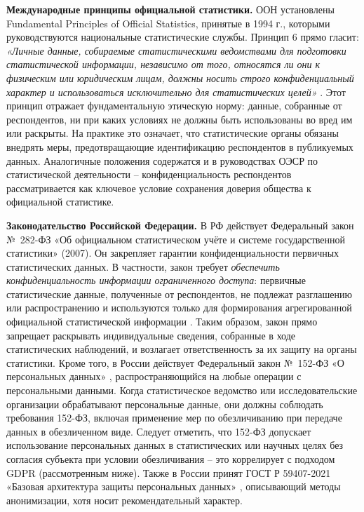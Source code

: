 \textbf{Международные принципы официальной статистики.} ООН
установлены Fundamental Principles of Official Statistics, принятые в 1994 г., которыми руководствуются национальные
статистические службы. Принцип 6 прямо гласит: \textit{«Личные данные, собираемые статистическими ведомствами для
подготовки статистической информации, независимо от того, относятся ли они к физическим или юридическим лицам, должны
носить строго конфиденциальный характер и использоваться исключительно для статистических целей»}
\autocite{unstats-un-org}. Этот принцип отражает фундаментальную этическую норму: данные, собранные от респондентов, ни
при каких условиях не должны быть использованы во вред им или раскрыты. На практике это означает, что статистические
органы обязаны внедрять меры, предотвращающие идентификацию респондентов в публикуемых данных. Аналогичные положения
содержатся и в руководствах ОЭСР по статистической деятельности – конфиденциальность респондентов рассматривается как
ключевое условие сохранения доверия общества к официальной статистике.

\textbf{Законодательство Российской Федерации.} В
РФ действует Федеральный закон № 282-ФЗ «Об официальном статистическом учёте и системе государственной статистики»
(2007). Он закрепляет гарантии конфиденциальности первичных статистических данных. В частности, закон требует
\textit{обеспечить конфиденциальность информации ограниченного доступа}: первичные статистические данные, полученные от
респондентов, не подлежат разглашению или распространению и используются только для формирования агрегированной
официальной статистической информации \autocite{rg-ru}. Таким образом, закон прямо запрещает раскрывать индивидуальные
сведения, собранные в ходе статистических наблюдений, и возлагает ответственность за их защиту на органы статистики.
Кроме того, в России действует Федеральный закон № 152-ФЗ «О персональных данных» \autocite{FZ152}, распространяющийся
на любые операции с персональными данными. Когда статистическое ведомство или исследовательские организации обрабатывают
персональные данные, они должны соблюдать требования 152-ФЗ, включая применение мер по обезличиванию при передаче данных
в обезличенном виде. Следует отметить, что 152-ФЗ допускает использование персональных данных в статистических или
научных целях без согласия субъекта при условии обезличивания – это коррелирует с подходом GDPR (рассмотренным ниже).
Также в России принят ГОСТ Р 59407-2021 «Базовая архитектура защиты персональных данных» \autocite{GOST}, описывающий
методы анонимизации, хотя носит рекомендательный характер.

